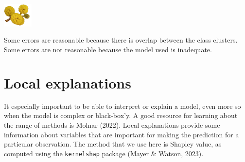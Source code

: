 \documentclass[
  letterpaper,
]{krantz}
\newcommand{\infobox}[1]{%
\noindent\colorbox{info!30}{%
\begin{minipage}{0.98\linewidth}%
    \centering%
    \begin{minipage}[c]{0.15\linewidth} %
      \includegraphics[width=1.5cm]{images/mulga-flowers2.png} %
    \end{minipage}%
    \hfill %
    \begin{minipage}[c]{0.8\linewidth} %
      \bigskip%
      \textsf{#1}%
      \bigskip%
    \end{minipage}%
    \hspace*{3mm}%
  \end{minipage}%
}%
}
\begin{document}
\infobox{Some errors are reasonable because there is overlap between the class clusters. Some errors are not reasonable because the model used is inadequate.
}

\section{Local explanations}\label{local-explanations}

 

It especially important to be able to interpret or explain a model, even
more so when the model is complex or black-box'y. A good resource for
learning about the range of methods is Molnar (2022). Local explanations
provide some information about variables that are important for making
the prediction for a particular observation. The method that we use here
is Shapley value, as computed using the \texttt{kernelshap} package
(Mayer \& Watson, 2023).
\end{document}

